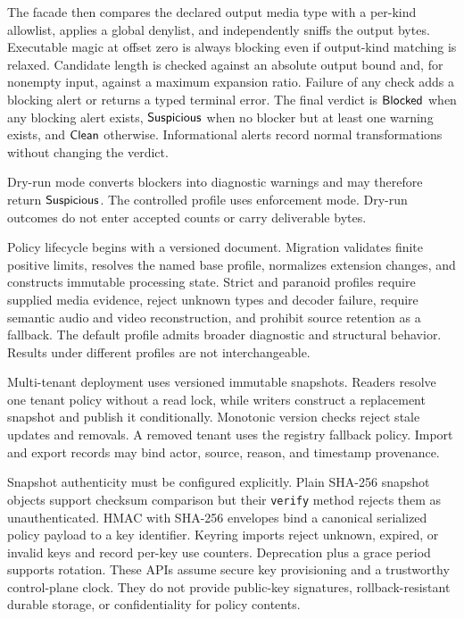 The facade then compares the declared output media type with a per-kind
allowlist, applies a global denylist, and independently sniffs the output bytes.
Executable magic at offset zero is always blocking even if output-kind matching
is relaxed. Candidate length is checked against an absolute output bound and,
for nonempty input, against a maximum expansion ratio. Failure of any check adds
a blocking alert or returns a typed terminal error. The final verdict is
\(\mathsf{Blocked}\) when any blocking alert exists, \(\mathsf{Suspicious}\) when no blocker but at
least one warning exists, and \(\mathsf{Clean}\) otherwise. Informational alerts record
normal transformations without changing the verdict.

Dry-run mode converts blockers into diagnostic warnings and may therefore
return \(\mathsf{Suspicious}\). The controlled profile uses enforcement mode. Dry-run
outcomes do not enter accepted counts or carry deliverable bytes.

Policy lifecycle begins with a versioned document. Migration validates finite
positive limits, resolves the named base profile, normalizes extension changes,
and constructs immutable processing state. Strict and paranoid profiles require
supplied media evidence, reject unknown types and decoder failure, require
semantic audio and video reconstruction, and prohibit source retention as a
fallback. The default profile admits broader diagnostic and structural
behavior. Results under different profiles are not interchangeable.

Multi-tenant deployment uses versioned immutable snapshots. Readers resolve one
tenant policy without a read lock, while writers construct a replacement
snapshot and publish it conditionally. Monotonic version checks reject stale
updates and removals. A removed tenant uses the registry fallback policy.
Import and export records may bind actor, source, reason, and timestamp
provenance.

Snapshot authenticity must be configured explicitly. Plain SHA-256 snapshot
objects support checksum comparison but their \texttt{verify} method rejects
them as unauthenticated. HMAC with SHA-256 envelopes bind a canonical serialized
policy payload to a key identifier. Keyring imports reject unknown, expired,
or invalid keys and record per-key use counters. Deprecation plus a grace
period supports rotation. These APIs assume secure key provisioning and a
trustworthy control-plane clock. They do not provide public-key signatures,
rollback-resistant durable storage, or confidentiality for policy contents.

